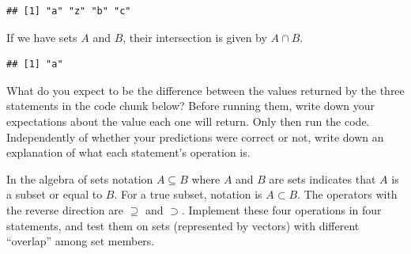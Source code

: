 \documentclass[krantz2]{krantz}\usepackage{knitr}%
\begin{document}
\begin{knitrout}\footnotesize
{}\color{fgcolor}\begin{kframe}
\begin{alltt}
\hlstd{(}\hlstd{(}\hlstd{,} \hlstd{,} 
\end{alltt}
\begin{verbatim}
## [1] "a" "z" "b" "c"
\end{verbatim}
\end{kframe}
\end{knitrout}

If we have sets $A$ and $B$, their intersection is given by $A \cap B$.

\begin{knitrout}\footnotesize
{}\color{fgcolor}\begin{kframe}
\begin{alltt}
\hlstd{(}\hlstd{(}\hlstd{,} \hlstd{,} 
\end{alltt}
\begin{verbatim}
## [1] "a"
\end{verbatim}
\end{kframe}
\end{knitrout}

\begin{playground}
What do you expect to be the difference between the values returned by the three statements in the code chunk below? Before running them, write down your expectations about the value each one will return. Only then run the code. Independently of whether your predictions were correct or not, write down an explanation of what each statement's operation is.

\begin{knitrout}\footnotesize
{}\color{fgcolor}\begin{kframe}
\begin{alltt}
\hlstd{(}\hlstd{(}\hlstd{,} \hlstd{,} 
\hlstd{(}\hlstd{(}\hlstd{,} \hlstd{,} 
\hlstd{(}\hlstd{,} \hlstd{,} 
\end{alltt}
\end{kframe}
\end{knitrout}

In the algebra of sets notation $A \subseteq B$ where $A$ and $B$ are sets indicates that $A$ is a subset or equal to $B$. For a true subset, notation is $A \subset B$. The operators with the reverse direction are $\supseteq$ and $\supset$. Implement these four operations in four \Rlang statements, and test them on sets (represented by \Rlang vectors) with different ``overlap'' among set members.

\end{playground}
\end{document}
